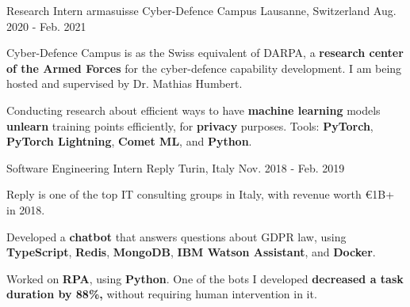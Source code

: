 

\begin{cventries}

  \cventry
    {Research Intern} %
    {armasuisse Cyber-Defence Campus} %
    {Lausanne, Switzerland} %
    {Aug. 2020 - Feb. 2021} %
    {
      \begin{cvitems} %
        \item Cyber-Defence Campus is as the Swiss equivalent of DARPA, a \textbf{research center of the Armed Forces} for the cyber-defence capability development. I am being hosted and supervised by Dr. Mathias Humbert.
        \item Conducting research about efficient ways to have \textbf{machine learning} models \textbf{unlearn} training points efficiently, for \textbf{privacy} purposes. Tools: \textbf{PyTorch}, \textbf{PyTorch Lightning}, \textbf{Comet ML}, and \textbf{Python}.
      \end{cvitems}
    }

  \cventry
    {Software Engineering Intern} %
    {Reply} %
    {Turin, Italy} %
    {Nov. 2018 - Feb. 2019} %
    {
      \begin{cvitems} %
        \item Reply is one of the top IT consulting groups in Italy, with revenue worth €1B+ in 2018.
        \item Developed a \textbf{chatbot} that answers questions about GDPR law, using \textbf{TypeScript}, \textbf{Redis}, \textbf{MongoDB}, \textbf{IBM Watson Assistant}, and \textbf{Docker}.
        \item Worked on \textbf{RPA}, using \textbf{Python}. One of the bots I developed \textbf{decreased a task duration by 88\%,} without requiring human intervention in it.
      \end{cvitems}
    }

\end{cventries}
